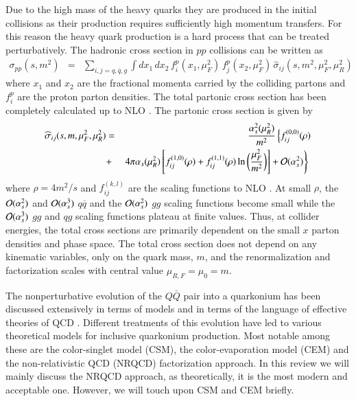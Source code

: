 Due to the high mass of the heavy quarks they are produced in the initial
collisions as their production requires sufficiently high momentum 
transfers. For this reason the heavy quark production
is a hard process that can be treated perturbatively.
The hadronic cross section in $pp$ collisions can
be written as
\begin{eqnarray}
\sigma_{pp}(s,m^2) & = & \sum_{i,j = q, \overline q, g} 
\int dx_1 \, dx_2 \, 
f_i^p (x_1,\mu_F^2) \,
f_j^p(x_2,\mu_F^2) \, \widehat{\sigma}_{ij}(s,m^2,\mu_F^2,\mu_R^2)
\label{sigpp}
\end{eqnarray}
where $x_1$ and $x_2$ are the fractional momenta carried by the colliding
partons and $f_i^p$ are the proton parton densities.
The total partonic cross section has been completely calculated up to NLO
\cite{Nason:1987xz,Nason:1989zy}. The partonic cross section is given by
\begin{eqnarray}
\widehat{\sigma}_{ij}(s,m,\mu_F^2,\mu_R^2) & = & 
\frac{\alpha_s^2(\mu_R^2)}{m^2}
\left\{ f^{(0,0)}_{ij}(\rho) \right. \nonumber \\
 & + & \left. 4\pi \alpha_s(\mu_R^2) \left[f^{(1,0)}_{ij}(\rho) + 
f^{(1,1)}_{ij}(\rho)\ln\bigg(\frac{\mu_F^2}{m^2} \bigg) \right] 
+ {\cal O}(\alpha_s^2) \right\}
\,\, 
\label{sigpart}
\end{eqnarray}
where $\rho = 4m^2/s$ and 
$f_{ij}^{(k,l)}$ are the scaling functions to NLO \cite{Nason:1987xz,Nason:1989zy}. 
At small $\rho$, the ${\cal O}(\alpha_s^2)$ and ${\cal O}(\alpha_s^3)$
$q \overline q$ and the ${\cal O}(\alpha_s^2)$ $gg$ scaling functions 
become small while the ${\cal O}(\alpha_s^3)$ $gg$ and $qg$ scaling functions
plateau at finite values.  Thus, at collider energies, the total cross sections
are primarily dependent on the small $x$ parton densities and phase space.
The total cross section does not depend on any kinematic variables, 
only on the quark mass, $m$, and the renormalization and factorization scales with central
value $\mu_{R,F} =\mu_0 = m$.


The nonperturbative evolution of the $Q\bar Q$ pair into a quarkonium
has been discussed extensively in terms of models and in terms of the
language of effective theories of QCD
\cite{Bodwin:1994jh,Brambilla:2004wf}. Different
treatments of this evolution have led to various theoretical models for
inclusive quarkonium production. Most notable among these are the color-singlet
model (CSM), the color-evaporation model (CEM) and the non-relativistic QCD
(NRQCD) factorization approach. In this review we will mainly discuss the NRQCD 
approach, as theoretically, it is the most modern and acceptable one. However,
we will touch upon CSM and CEM briefly. 





